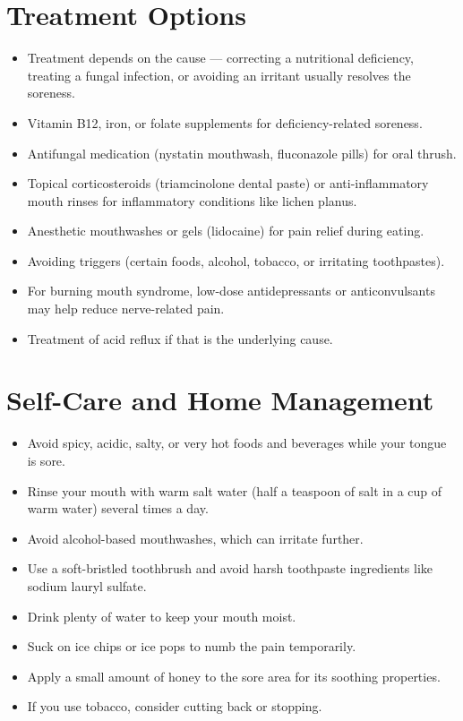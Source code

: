 \section*{Treatment Options}
\begin{itemize}
  \item Treatment depends on the cause — correcting a nutritional deficiency, treating a fungal infection, or avoiding an irritant usually resolves the soreness.
  \item Vitamin B12, iron, or folate supplements for deficiency-related soreness.
  \item Antifungal medication (nystatin mouthwash, fluconazole pills) for oral thrush.
  \item Topical corticosteroids (triamcinolone dental paste) or anti-inflammatory mouth rinses for inflammatory conditions like lichen planus.
  \item Anesthetic mouthwashes or gels (lidocaine) for pain relief during eating.
  \item Avoiding triggers (certain foods, alcohol, tobacco, or irritating toothpastes).
  \item For burning mouth syndrome, low-dose antidepressants or anticonvulsants may help reduce nerve-related pain.
  \item Treatment of acid reflux if that is the underlying cause.
\end{itemize}

\section*{Self-Care and Home Management}
\begin{itemize}
  \item Avoid spicy, acidic, salty, or very hot foods and beverages while your tongue is sore.
  \item Rinse your mouth with warm salt water (half a teaspoon of salt in a cup of warm water) several times a day.
  \item Avoid alcohol-based mouthwashes, which can irritate further.
  \item Use a soft-bristled toothbrush and avoid harsh toothpaste ingredients like sodium lauryl sulfate.
  \item Drink plenty of water to keep your mouth moist.
  \item Suck on ice chips or ice pops to numb the pain temporarily.
  \item Apply a small amount of honey to the sore area for its soothing properties.
  \item If you use tobacco, consider cutting back or stopping.
\end{itemize}

